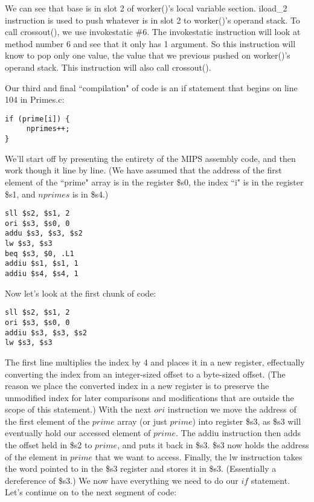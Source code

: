 \documentclass[11pt]{article}
\begin{document}
We can see that base is in slot 2 of worker()'s local variable section. iload\_2 instruction is used to push whatever is in slot 2 to worker()'s operand stack. To call crossout(), we use invokestatic \#6. The invokestatic instruction will look at method number 6 and see that it only has 1 argument. So this instruction will know to pop only one value, the value that we previous pushed on worker()'s operand stack. This instruction will also call crossout().




Our third and final ``compilation" of code is an if statement that begins on line 104 in Primes.c:

\begin{verbatim}
if (prime[i]) {
     nprimes++;
}
\end{verbatim}

We'll start off by presenting the entirety of the MIPS assembly code, and then work though it line by line. (We have assumed that the address of the first element of the ``prime" array is in the register \$s0, the index ``i" is in the register \$s1, and $nprimes$ is in \$s4.)

\begin{verbatim}
sll $s2, $s1, 2
ori $s3, $s0, 0
addu $s3, $s3, $s2
lw $s3, $s3
beq $s3, $0, .L1
addiu $s1, $s1, 1
addiu $s4, $s4, 1
\end{verbatim}

Now let's look at the first chunk of code:

\begin{verbatim}
sll $s2, $s1, 2
ori $s3, $s0, 0
addiu $s3, $s3, $s2
lw $s3, $s3
\end{verbatim}

The first line multiplies the index by 4 and places it in a new register, effectually converting the index from an integer-sized offset to a byte-sized offset. (The reason we place the converted index in a new register is to preserve the unmodified index for later comparisons and modifications that are outside the scope of this statement.) With the next $ori$ instruction we move the address of the first element of the $prime$ array (or just $prime$) into register \$s3, as \$s3 will eventually hold our accessed element of $prime$. The addiu instruction then adds the offset held in \$s2 to $prime$, and puts it back in \$s3. \$s3 now holds the address of the element in $prime$ that we want to access. Finally, the lw instruction takes the word pointed to in the \$s3 register and stores it in \$s3. (Essentially a dereference of \$s3.) We now have everything we need to do our $if$ statement. Let's continue on to the next segment of code:
\end{document}
